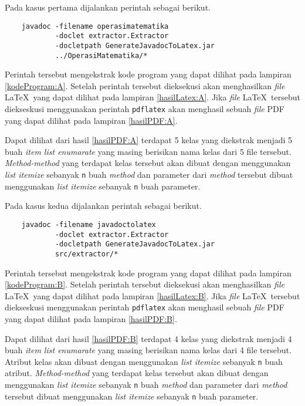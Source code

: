 Pada kasus pertama dijalankan perintah sebagai berikut.

\begin{verbatim}
	javadoc -filename operasimatematika
	        -doclet extractor.Extractor
	        -docletpath GenerateJavadocToLatex.jar
	        ../OperasiMatematika/*
\end{verbatim}

Perintah tersebut mengekstrak kode program yang dapat dilihat pada lampiran \ref{kodeProgram:A}. Setelah perintah tersebut dieksekusi akan menghasilkan {\it file} \LaTeX\ yang dapat dilihat pada lampiran \ref{hasilLatex:A}. Jika {\it file} \LaTeX\ tersebut diekseskusi menggunakan perintah {\tt pdflatex} akan menghasil sebuah {\it file} PDF yang dapat dilihat pada lampiran \ref{hasilPDF:A}.

Dapat dilihat dari hasil \ref{hasilPDF:A} terdapat 5 kelas yang diekstrak menjadi 5 buah {\it item list enumarate} yang masing berisikan nama kelas dari 5 file tersebut. {\it Method-method} yang terdapat kelas tersebut akan dibuat dengan menggunakan {\it list itemize} sebanyak {\tt n} buah {\it method} dan parameter dari {\it method} tersebut dibuat menggunakan {\it list itemize} sebanyak {\tt n} buah parameter.

Pada kasus kedua dijalankan perintah sebagai berikut.

\begin{verbatim}
	javadoc -filename javadoctolatex
	        -doclet extractor.Extractor
	        -docletpath GenerateJavadocToLatex.jar
	        src/extractor/*
\end{verbatim}

Perintah tersebut mengekstrak kode program yang dapat dilihat pada lampiran \ref{kodeProgram:B}. Setelah perintah tersebut dieksekusi akan menghasilkan {\it file} \LaTeX\ yang dapat dilihat pada lampiran \ref{hasilLatex:B}. Jika {\it file} \LaTeX\ tersebut diekseskusi menggunakan perintah {\tt pdflatex} akan menghasil sebuah {\it file} PDF yang dapat dilihat pada lampiran \ref{hasilPDF:B}.

Dapat dilihat dari hasil \ref{hasilPDF:B} terdapat 4 kelas yang diekstrak menjadi 4 buah {\it item list enumarate} yang masing berisikan nama kelas dari 4 file tersebut. Atribut kelas akan dibuat dengan menggunakan {\it list itemize} sebanyak {\tt n} buah atribut. {\it Method-method} yang terdapat kelas tersebut akan dibuat dengan menggunakan {\it list itemize} sebanyak {\tt n} buah {\it method} dan parameter dari {\it method} tersebut dibuat menggunakan {\it list itemize} sebanyak {\tt n} buah parameter.

